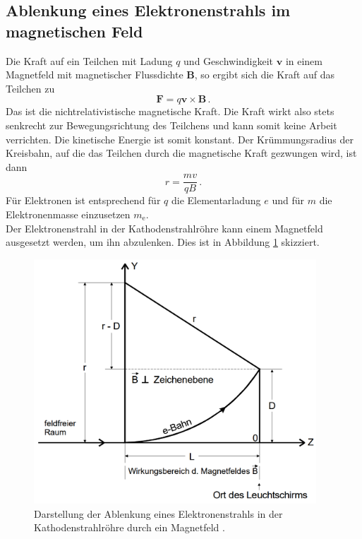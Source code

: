 \subsection{Ablenkung eines Elektronenstrahls im magnetischen Feld}
\label{subsec:immagnetfeld}
Die Kraft auf ein Teilchen mit Ladung $q$ und Geschwindigkeit $\symbf{v}$ in einem
Magnetfeld mit magnetischer Flussdichte $\symbf{B}$, so ergibt sich die Kraft
auf das Teilchen zu
\begin{equation}
  \symbf{F} = q \symbf{v} \times \symbf{B}\,.
  \label{eqn:magkraft}
\end{equation}
Das ist die nichtrelativistische magnetische Kraft. Die Kraft wirkt also stets senkrecht
zur Bewegungsrichtung des Teilchens und kann somit keine Arbeit verrichten.
Die kinetische Energie ist somit konstant.
Der Krümmungsradius der Kreisbahn, auf die das Teilchen durch die magnetische Kraft gezwungen
wird, ist dann
\begin{equation}
  r = \frac{m v}{q B}\,.
  \label{eqn:kruemmung}
\end{equation}
Für Elektronen ist entsprechend für $q$ die Elementarladung $e$ und für $m$ die Elektronenmasse
einzusetzen $m_\text{e}$. \\
Der Elektronenstrahl in der Kathodenstrahlröhre kann einem Magnetfeld ausgesetzt werden,
um ihn abzulenken. Dies ist in Abbildung \ref{fig:magnetkathode} skizziert.

\begin{figure}[H]
  \centering
  \includegraphics[width=300pt]{data/immagnetfeld.png}
  \caption{Darstellung der Ablenkung eines Elektronenstrahls in der Kathodenstrahlröhre durch ein Magnetfeld \cite{Versuchsanleitung502}.}
  \label{fig:magnetkathode}
\end{figure}

